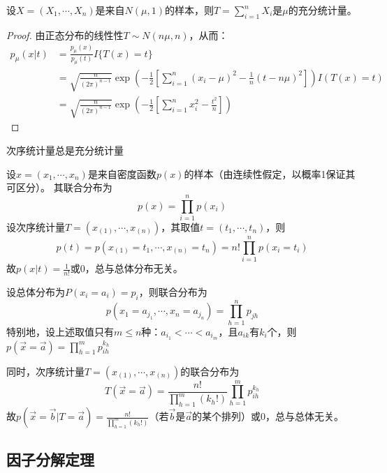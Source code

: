 \documentclass[UTF-8]{ctexbeamer}
\begin{document}
\begin{frame}
  \begin{Eg}
    设$X=(X_{1},\cdots,X_{n})$是来自$N(\mu,1)$的样本，则$T=\sum_{i=1}^{n}X_{i}$是$\mu$的充分统计量。
    \end{Eg}
\begin{proof}
    由正态分布的线性性$T\sim N(n\mu,n)$，从而：
    \begin{align*}
      p_{\mu}(x|t)&=\frac{p_{\mu}(x)}{p_{\mu}(t)}I\{T(x)=t\}\\
                 &=\sqrt{\frac{n}{(2\pi)^{n-1}}}\exp(-\frac{1}{2}[\sum\limits^{n}_{i=1}(x_{i}-\mu)^{2}-\frac{1}{n}(t-n\mu)^{2}])I(T(x)=t)\\
                 &=\sqrt{\frac{n}{(2\pi)^{n-1}}}\exp(-\frac{1}{2}[\sum\limits^{n}_{i=1}x^{2}_{i}-\frac{t^{2}}{n}])
    \end{align*}
\end{proof}
\end{frame}

\begin{frame}
  次序统计量总是充分统计量
  \begin{Eg}
    设$x=(x_{1},\cdots,x_{n})$是来自密度函数$p(x)$的样本（由连续性假定，以概率1保证其可区分）。
    其联合分布为
    \[p(x)=\prod_{i=1}^{n}p(x_{i})\]
    设次序统计量$T=(x_{(1)},\cdots,x_{(n)})$，其取值$t=(t_{1},\cdots,t_{n})$，则
    \[p(t)=p(x_{(1)}=t_{1},\cdots,x_{(n)}=t_{n})=n!\prod_{i=1}^{n}p(x_{i}=t_{i})\]
    故$p(x|t)=\frac{1}{n!}$或0，总与总体分布无关。
  \end{Eg}
\end{frame}

\begin{frame}
  \begin{Eg}
    设总体分布为$P(x_{i}=a_{i})=p_{i}$，则联合分布为
    \[p(x_{1}=a_{j_{1}},\cdots,x_{n}=a_{{j_{n}}})=\prod_{h=1}^{n}p_{jh}\]
    特别地，设上述取值只有$m\leq n$种：$a_{i_{1}}<\cdots<a_{i_{m}}$，且$a_{ik}$有$k_{i}$个，则
    $p(\vec x=\vec a)=\prod_{h=1}^{m}p_{ih}^{k_{h}}$

    同时，次序统计量$T=(x_{(1)},\cdots,x_{(n)})$的联合分布为
    \[T(\vec x=\vec a)=\frac{n!}{\prod_{h=1}^{m}(k_{h}!)}\prod_{h=1}^{m}p_{ih}^{k_{h}}\]
    故$p(\vec x=\vec b|T=\vec a)=\frac{n!}{\prod_{h=1}^{m}(k_{h}!)}$（若$\vec b$是$\vec a$的某个排列）或0，总与总体无关。
  \end{Eg}
\end{frame}


\subsection{因子分解定理}
\end{document}
